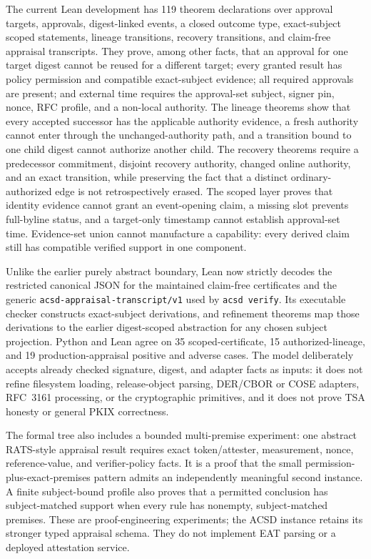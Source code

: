 \documentclass[acmsmall,screen,review,nonacm]{acmart}
\begin{document}
The current Lean development has 119 theorem declarations over approval
targets, approvals, digest-linked events, a closed outcome type, exact-subject
scoped statements, lineage transitions, recovery transitions, and claim-free
appraisal transcripts. They
prove, among other facts, that an approval for one target digest cannot be
reused for a different target; every granted result has policy permission and
compatible exact-subject evidence; all required approvals are present; and
external time requires the approval-set subject, signer pin, nonce, RFC profile,
and a non-local authority. The lineage theorems show that every accepted
successor has the applicable authority evidence, a fresh authority cannot enter
through the unchanged-authority path, and a transition bound to one child
digest cannot authorize another child. The recovery theorems require a
predecessor commitment, disjoint recovery authority, changed online authority,
and an exact transition, while preserving the fact that a distinct
ordinary-authorized edge is not retrospectively erased. The scoped layer proves that identity
evidence cannot grant an event-opening claim, a missing slot prevents
full-byline status, and a target-only timestamp cannot establish approval-set
time. Evidence-set union cannot manufacture a capability: every derived claim
still has compatible verified support in one component.

Unlike the earlier purely abstract boundary, Lean now strictly decodes the
restricted canonical JSON for the maintained claim-free certificates and the
generic \texttt{acsd-appraisal-transcript/v1} used by \texttt{acsd verify}.
Its executable checker constructs exact-subject derivations, and refinement
theorems map those derivations to the earlier digest-scoped abstraction for any
chosen subject projection. Python and Lean agree on 35 scoped-certificate, 15
authorized-lineage, and 19 production-appraisal positive and adverse cases.
The model deliberately accepts already checked signature, digest, and adapter
facts as inputs: it does not refine filesystem loading, release-object parsing,
DER/CBOR or COSE adapters, RFC~3161 processing, or the cryptographic primitives,
and it does not prove TSA honesty or general PKIX correctness.

The formal tree also includes a bounded multi-premise experiment: one abstract
RATS-style appraisal result requires exact token/attester, measurement, nonce,
reference-value, and verifier-policy facts. It is a proof that the small
permission-plus-exact-premises pattern admits an independently meaningful
second instance. A finite subject-bound profile also proves that a permitted
conclusion has subject-matched support when every rule has nonempty,
subject-matched premises. These are proof-engineering experiments; the ACSD
instance retains its stronger typed appraisal schema. They do not implement
EAT parsing or a deployed attestation service.
\end{document}
